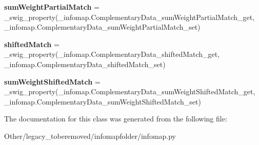 \begin{DoxyCompactItemize}
\item 
\mbox{\label{classinfomapfolder_1_1infomap_1_1ComplementaryData_ac65ff25fbdcbc27270edac248c5c03cd}} 
{\bfseries sum\+Weight\+Partial\+Match} = \+\_\+swig\+\_\+property(\+\_\+infomap.\+Complementary\+Data\+\_\+sum\+Weight\+Partial\+Match\+\_\+get, \+\_\+infomap.\+Complementary\+Data\+\_\+sum\+Weight\+Partial\+Match\+\_\+set)
\item 
\mbox{\label{classinfomapfolder_1_1infomap_1_1ComplementaryData_a3b25425b89e455a832cfe9aee7501442}} 
{\bfseries shifted\+Match} = \+\_\+swig\+\_\+property(\+\_\+infomap.\+Complementary\+Data\+\_\+shifted\+Match\+\_\+get, \+\_\+infomap.\+Complementary\+Data\+\_\+shifted\+Match\+\_\+set)
\item 
\mbox{\label{classinfomapfolder_1_1infomap_1_1ComplementaryData_acfa950664a47157400fe45a190d5a659}} 
{\bfseries sum\+Weight\+Shifted\+Match} = \+\_\+swig\+\_\+property(\+\_\+infomap.\+Complementary\+Data\+\_\+sum\+Weight\+Shifted\+Match\+\_\+get, \+\_\+infomap.\+Complementary\+Data\+\_\+sum\+Weight\+Shifted\+Match\+\_\+set)
\end{DoxyCompactItemize}


The documentation for this class was generated from the following file\+:\begin{DoxyCompactItemize}
\item 
Other/legacy\+\_\+toberemoved/infomapfolder/infomap.\+py\end{DoxyCompactItemize}
